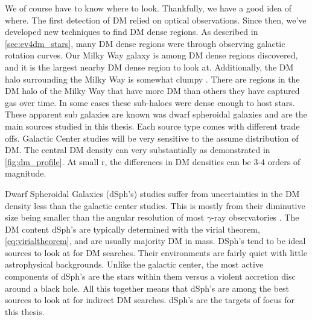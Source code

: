 \begin{figure}
\end{figure}

We of course have to know where to look.
Thankfully, we have a good idea of where.
The first detection of DM relied on optical observations.
Since then, we've developed new techniques to find DM dense regions.
As described in \cref{sec:ev4dm_stars}, many DM dense regions were through observing galactic rotation curves.
Our Milky Way galaxy is among DM dense regions discovered, and it is the largest nearby DM dense region to look at.
Additionally, the DM halo surrounding the Milky Way is somewhat clumpy \cite{Tracy:les_houches}.
There are regions in the DM halo of the Milky Way that have more DM than others they have captured gas over time.
In some cases these sub-haloes were dense enough to host stars.
These apparent sub galaxies are known was dwarf spheroidal galaxies and are the main sources studied in this thesis.
Each source type comes with different trade offs.
Galactic Center studies will be very sensitive to the assume distribution of DM.
The central DM density can very substantially as demonstrated in \cref{fig:dm_profile}.
At small r, the differences in DM densities can be 3-4 orders of magnitude.

Dwarf Spheroidal Galaxies (dSph's) studies suffer from uncertainties in the DM density less than the galactic center studies.
This is mostly from their diminutive size being smaller than the angular resolution of most $\gamma$-ray observatories \cite{Tracy:les_houches}.
The DM content dSph's are typically determined with the virial theorem, \cref{eq:virialtheorem}, and are usually majority DM \cite{Tracy:les_houches} in mass.
DSph's tend to be ideal sources to look at for DM searches.
Their environments are fairly quiet with little astrophysical backgrounds.
Unlike the galactic center, the most active components of dSph's are the stars within them versus a violent accretion disc around a black hole.
All this together means that dSph's are among the best sources to look at for indirect DM searches.
dSph's are the targets of focus for this thesis.

